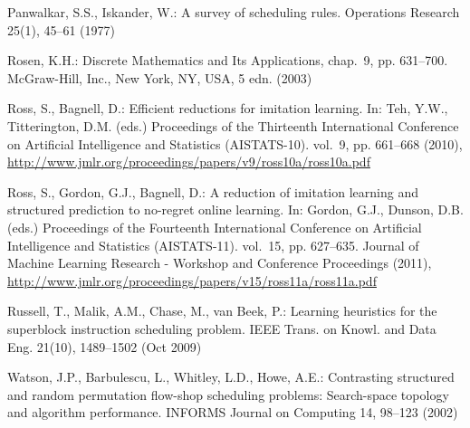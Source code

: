 \documentclass[smallextended]{llncs}
\begin{document}
\begin{thebibliography}{10}
	Panwalkar, S.S., Iskander, W.: A survey of scheduling rules. Operations
	Research  25(1),  45--61 (1977)
	
	Rosen, K.H.: Discrete Mathematics and Its Applications, chap.~9, pp. 631--700.
	McGraw-Hill, Inc., New York, NY, USA, 5 edn. (2003)
	
	Ross, S., Bagnell, D.: Efficient reductions for imitation learning. In: Teh,
	Y.W., Titterington, D.M. (eds.) Proceedings of the Thirteenth International
	Conference on Artificial Intelligence and Statistics (AISTATS-10). vol.~9,
	pp. 661--668 (2010),
	\url{http://www.jmlr.org/proceedings/papers/v9/ross10a/ross10a.pdf}
	
	Ross, S., Gordon, G.J., Bagnell, D.: A reduction of imitation learning and
	structured prediction to no-regret online learning. In: Gordon, G.J., Dunson,
	D.B. (eds.) Proceedings of the Fourteenth International Conference on
	Artificial Intelligence and Statistics (AISTATS-11). vol.~15, pp. 627--635.
	Journal of Machine Learning Research - Workshop and Conference Proceedings
	(2011), \url{http://www.jmlr.org/proceedings/papers/v15/ross11a/ross11a.pdf}
	
	Russell, T., Malik, A.M., Chase, M., van Beek, P.: Learning heuristics for the
	superblock instruction scheduling problem. IEEE Trans. on Knowl. and Data
	Eng.  21(10),  1489--1502 (Oct 2009)
	
	Watson, J.P., Barbulescu, L., Whitley, L.D., Howe, A.E.: Contrasting structured
	and random permutation flow-shop scheduling problems: Search-space topology
	and algorithm performance. INFORMS Journal on Computing  14,  98--123 (2002)
	
\end{thebibliography}
\end{document}
